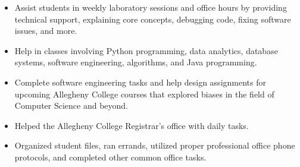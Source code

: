 \documentclass[10pt,a4paper]{altacv}
\begin{document}

\begin{fullwidth}
\makecvheader
\end{fullwidth}




\begin{itemize}
\item Assist students in weekly laboratory sessions and office hours by providing technical support, explaining core concepts, debugging code, fixing software issues, and more.
\item Help in classes involving Python programming, data analytics, database systems, software engineering, algorithms, and Java programming.
\end{itemize}

\divider

\begin{itemize}
\item Complete software engineering tasks and help design assignments for upcoming Allegheny College courses that explored biases in the field of Computer Science and beyond.
\end{itemize}

\divider

\begin{itemize}
\item Helped the Allegheny College Registrar's office with daily tasks.
\item Organized student files, ran errands, utilized proper professional office phone protocols, and completed other common office tasks.
\end{itemize}
\end{document}
